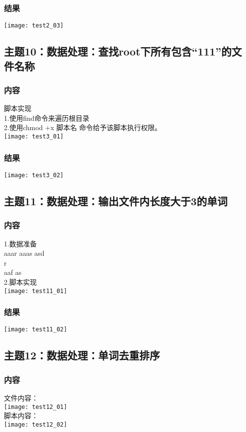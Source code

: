 \documentclass{article}
\begin{document}
\subsubsection{结果}   
\texttt{[image: test2\_03]}\\
\subsection{主题10：数据处理：查找root下所有包含“111”的文件名称}  
\subsubsection{内容}
脚本实现\\
1.使用find命令来遍历根目录\\
2.使用chmod +x 脚本名 命令给予该脚本执行权限。\\
\texttt{[image: test3\_01]}\\
\subsubsection{结果}  
\texttt{[image: test3\_02]}\\
\subsection{主题11：数据处理：输出文件内长度大于3的单词}  
\subsubsection{内容}
1.数据准备\\
aaar aaas asd\\
r\\
aaf as\\
2.脚本实现\\
\texttt{[image: test11\_01]}\\
\subsubsection{结果}  
\texttt{[image: test11\_02]}\\
\subsection{主题12：数据处理：单词去重排序}  
\subsubsection{内容}
文件内容：\\
\texttt{[image: test12\_01]}\\
脚本内容：\\
\texttt{[image: test12\_02]}\\
\end{document}
